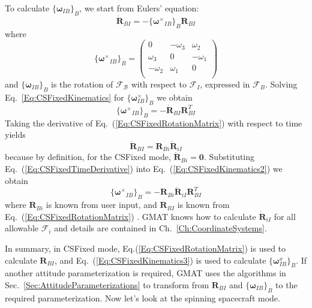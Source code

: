 To calculate $\{\mathbf{\boldsymbol\omega}_{IB}\}_B$, we start from
Eulers' equation:
%
\begin{equation}
   \dot{\mathbf{R}}_{BI} =
   -\{\mathbf{\boldsymbol\omega^\times}_{IB}\}_B\mathbf{R}_{BI}
   \label{Eq:CSFixedKinematics}
\end{equation}
%
where
%
\begin{equation}
       \{ \mathbf{\boldsymbol\omega^\times}_{IB}\}_B = \begin{pmatrix}
     0 & -\omega_3 & \omega_2\\
     \omega_3 & 0 & -\omega_1\\
     -\omega_2 & \omega_1 & 0\\
     \end{pmatrix}
\end{equation}
%
and $\{\mathbf{\boldsymbol\omega}_{IB}\}_B$ is the rotation of
$\mathcal{F_B}$ with respect to $\mathcal{F}_I$, expressed in
$\mathcal{F}_B$.
%
Solving Eq.~\ref{Eq:CSFixedKinematics} for
$\{\mathbf{\boldsymbol\omega}_{IB}^\times\}_B$ we obtain
%
\begin{equation}
   \{\mathbf{\boldsymbol\omega^\times}_{IB}\}_B =  -\dot{\mathbf{R}}_{BI}
   \mathbf{R}_{BI}^{T}
   \label{Eq:CSFixedKinematics2}
\end{equation}
%
Taking the derivative of Eq.~(\ref{Eq:CSFixedRotationMatrix}) with
respect to time yields
%
\begin{equation}
     {\mathbf{\dot R}_{BI}} = \mathbf{R}_{Bi}{\mathbf{\dot
     R}_{iI}}\label{Eq:CSFixedTimeDerivative}
\end{equation}
%
because by definition, for the CSFixed mode,  $ \mathbf{\dot R}_{Bi}
= \mathbf{0}$. Substituting Eq.~(\ref{Eq:CSFixedTimeDerivative})
into Eq.~(\ref{Eq:CSFixedKinematics2}) we obtain
%
%
\begin{equation}
   \{\mathbf{\boldsymbol\omega^\times}_{IB}\}_B =  -\mathbf{R}_{Bi}{\mathbf{\dot
     R}_{iI}} \mathbf{R}_{BI}^{T}
   \label{Eq:CSFixedKinematics3}
\end{equation}
%
where $\mathbf{R}_{Bi}$ is known from user input, and
$\mathbf{R}_{BI}$ is known from Eq.~(\ref{Eq:CSFixedRotationMatrix})
. GMAT knows how to calculate $\mathbf{\dot{R}}_{iI}$ for all
allowable $\mathcal{F}_i$ and details are contained in
Ch.~\ref{Ch:CoordinateSystems}.

In summary, in CSFixed mode, Eq.(\ref{Eq:CSFixedRotationMatrix}) is
used to calculate $\mathbf{R}_{BI}$, and
Eq.~(\ref{Eq:CSFixedKinematics3}) is used to calculate
$\{\mathbf{\boldsymbol\omega}_{IB}^x\}_B$.  If another attitude
parameterization is required, GMAT uses the algorithms in
Sec.~\ref{Sec:AttitudeParameterizations} to transform from
$\mathbf{R}_{BI}$ and $\{\mathbf{\boldsymbol\omega}_{IB}\}_B$ to the
required parameterization.  Now let's look at the spinning
spacecraft mode.

